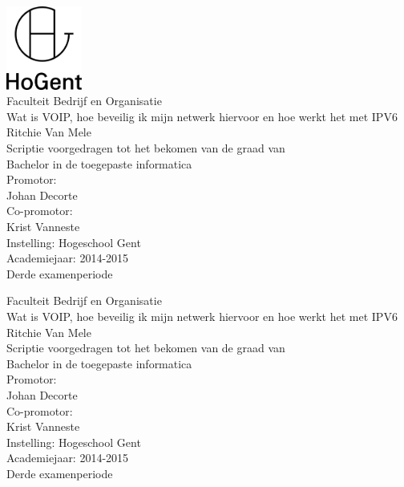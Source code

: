 \documentclass[pdftex,a4paper,12pt,twoside]{report}
\newcommand{\emptypage}{
\newpage
\thispagestyle{empty}
\mbox{}
\newpage
}
\newcommand{\student}{Ritchie Van Mele}
\newcommand{\promotor}{Johan Decorte}
\newcommand{\copromotor}{Krist Vanneste}
\newcommand{\instelling}{Hogeschool Gent}
\newcommand{\titel}{Wat is VOIP, hoe beveilig ik mijn netwerk hiervoor en hoe werkt het met IPV6}
\newcommand{\faculteit}{Faculteit Bedrijf en Organisatie}
\newcommand{\rapporttype}{Scriptie voorgedragen tot het bekomen van de graad van\\Bachelor in de toegepaste informatica}
\newcommand{\academiejaar}{2014-2015}
\newcommand{\examenperiode}{Derde examenperiode}
\begin{document}

\begin{titlepage}
  \begin{center}

    \begingroup
    \rmfamily
    \includegraphics[width=2.5cm]{img/HG-beeldmerk-woordmerk}\\[.5cm]
    \faculteit\\[3cm]
    \titel
    \vfill
    \student\\[3.5cm]
    \rapporttype\\[2cm]
    Promotor:\\
    \promotor\\
    Co-promotor:\\
    \copromotor\\[2.5cm]
    Instelling: \instelling\\[.5cm]
    Academiejaar: \academiejaar\\[.5cm]
    \examenperiode
    \endgroup

  \end{center}
  \restoregeometry
\end{titlepage}


\emptypage


\begin{titlepage}
  \begin{center}

    \begingroup
    \rmfamily
    \faculteit\\[3cm]
    \titel
    \vfill
    \student\\[3.5cm]
    \rapporttype\\[2cm]
    Promotor:\\
    \promotor\\
    Co-promotor:\\
    \copromotor\\[2.5cm]
    Instelling: \instelling\\[.5cm]
    Academiejaar: \academiejaar\\[.5cm]
    \examenperiode
    \endgroup

  \end{center}
  \restoregeometry
\end{titlepage}
\end{document}
